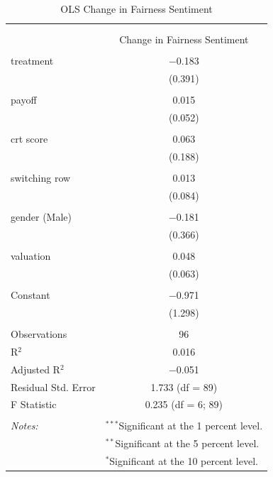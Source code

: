\begin{table}[!htbp] \centering 
  \caption{OLS Change in Fairness Sentiment} 
  \label{tab:fair_ols} 
\begin{tabular}{@{\extracolsep{5pt}}lc} 
\\[-1.8ex]\hline 
\hline \\[-1.8ex] 
\\[-1.8ex] & Change in Fairness Sentiment \\ 
\hline \\[-1.8ex] 
 treatment & $-$0.183 \\ 
  & (0.391) \\ 
  & \\ 
 payoff & 0.015 \\ 
  & (0.052) \\ 
  & \\ 
 crt score & 0.063 \\ 
  & (0.188) \\ 
  & \\ 
 switching row & 0.013 \\ 
  & (0.084) \\ 
  & \\ 
 gender (Male) & $-$0.181 \\ 
  & (0.366) \\ 
  & \\ 
 valuation & 0.048 \\ 
  & (0.063) \\ 
  & \\ 
 Constant & $-$0.971 \\ 
  & (1.298) \\ 
  & \\ 
  \hline
Observations & 96 \\ 
R$^{2}$ & 0.016 \\ 
Adjusted R$^{2}$ & $-$0.051 \\ 
Residual Std. Error & 1.733 (df = 89) \\ 
F Statistic & 0.235 (df = 6; 89) \\ 
\hline \\[-1.8ex] 
\textit{Notes:} & \multicolumn{1}{l}{$^{***}$Significant at the 1 percent level.} \\ 
 & \multicolumn{1}{l}{$^{**}$Significant at the 5 percent level.} \\ 
 & \multicolumn{1}{l}{$^{*}$Significant at the 10 percent level.} \\ 
\end{tabular} 
\end{table} 

